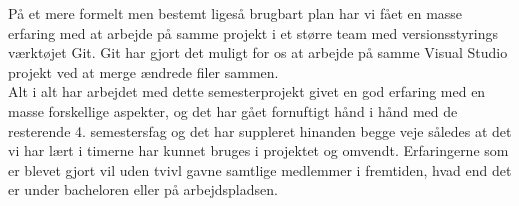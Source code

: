 På et mere formelt men bestemt ligeså brugbart plan har vi fået en masse erfaring med at arbejde på samme projekt i et større team med versionsstyrings værktøjet Git. Git har gjort det muligt for os at arbejde på samme Visual Studio projekt ved at merge ændrede filer sammen. \\

Alt i alt har arbejdet med dette semesterprojekt givet en god erfaring med en masse forskellige aspekter, og det har gået fornuftigt hånd i hånd med de resterende 4. semestersfag og det har suppleret hinanden begge veje således at det vi har lært i timerne har kunnet bruges i projektet og omvendt. Erfaringerne som er blevet gjort vil uden tvivl gavne samtlige medlemmer i fremtiden, hvad end det er under bacheloren eller på arbejdspladsen.








